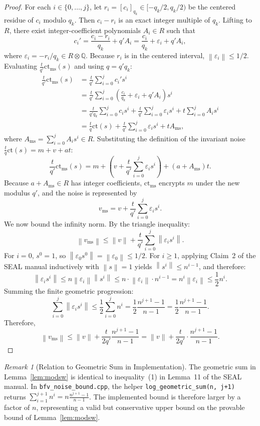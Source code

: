 \documentclass[11pt]{article}
\theoremstyle{definition}
\theoremstyle{remark}
\newtheorem{remark}{Remark}
\newcommand{\norm}[1]{\left\lVert #1\right\rVert}
\newcommand{\ct}{\mathrm{ct}}
\newcommand{\ctms}{\mathrm{ct}_{\mathrm{ms}}}
\newcommand{\vms}{v_{\mathrm{ms}}}
\newcommand{\Sgeo}[1]{\frac{n^{#1+1}-1}{n-1}}
\begin{document}
\begin{proof}
For each $i \in \{0, \dots, j\}$, let $r_i = [c_i]_{q_k} \in [-q_k/2, q_k/2)$ be the centered residue of $c_i$ modulo $q_k$.
Then $c_i - r_i$ is an exact integer multiple of $q_k$.
Lifting to $R$, there exist integer-coefficient polynomials $A_i \in R$ such that
\[
  c_i' = \frac{c_i - r_i}{q_k} + q' A_i = \frac{c_i}{q_k} + \varepsilon_i + q' A_i,
\]
where $\varepsilon_i = -r_i / q_k \in R \otimes \mathbb{Q}$.
Because $r_i$ is in the centered interval, $\norm{\varepsilon_i} \leq 1/2$.
Evaluating $\frac{t}{q'}\ctms(s)$ and using $q = q' q_k$:
\begin{align*}
  \frac{t}{q'}\ctms(s)
  &= \frac{t}{q'}\sum_{i=0}^j c_i' s^i\\
  &= \frac{t}{q'}\sum_{i=0}^j \left(\frac{c_i}{q_k} + \varepsilon_i + q' A_i\right) s^i\\
  &= \frac{t}{q' q_k}\sum_{i=0}^j c_i s^i + \frac{t}{q'}\sum_{i=0}^j \varepsilon_i s^i + t \sum_{i=0}^j A_i s^i\\
  &= \frac{t}{q}\ct(s) + \frac{t}{q'}\sum_{i=0}^j \varepsilon_i s^i + t A_{\mathrm{ms}},
\end{align*}
where $A_{\mathrm{ms}} = \sum_{i=0}^j A_i s^i \in R$.
Substituting the definition of the invariant noise $\frac{t}{q}\ct(s) = m + v + at$:
\[
  \frac{t}{q'}\ctms(s) = m + \left(v + \frac{t}{q'}\sum_{i=0}^j \varepsilon_i s^i\right) + (a + A_{\mathrm{ms}})t.
\]
Because $a + A_{\mathrm{ms}} \in R$ has integer coefficients, $\ctms$ encrypts $m$ under the new modulus $q'$, and the noise is represented by
\[
  \vms = v + \frac{t}{q'}\sum_{i=0}^j \varepsilon_i s^i.
\]
We now bound the infinity norm. By the triangle inequality:
\[
  \norm{\vms} \leq \norm{v} + \frac{t}{q'}\sum_{i=0}^j \norm{\varepsilon_i s^i}.
\]
For $i = 0$, $s^0 = 1$, so $\norm{\varepsilon_0 s^0} = \norm{\varepsilon_0} \leq 1/2$.
For $i \geq 1$, applying Claim~2 of the SEAL manual inductively with $\norm{s} = 1$ yields $\norm{s^i} \leq n^{i-1}$, and therefore:
\[
  \norm{\varepsilon_i s^i} \leq n \norm{\varepsilon_i} \norm{s^i} \leq n \cdot \norm{\varepsilon_i} \cdot n^{i-1} = n^i \norm{\varepsilon_i} \leq \frac{1}{2} n^i.
\]
Summing the finite geometric progression:
\[
  \sum_{i=0}^j \norm{\varepsilon_i s^i} \leq \frac{1}{2}\sum_{i=0}^j n^i = \frac{1}{2}\frac{n^{j+1}-1}{n-1} = \frac{1}{2}\Sgeo{j}.
\]
Therefore,
\[
  \norm{\vms} \leq \norm{v} + \frac{t}{2q'}\Sgeo{j} = \norm{v} + \frac{t}{2q'}\cdot\frac{n^{j+1}-1}{n-1}.
\]
\end{proof}

\begin{remark}[Relation to Geometric Sum in Implementation]
The geometric sum in Lemma~\ref{lem:modsw} is identical to inequality~(1) in Lemma~11 of the SEAL manual.
In \texttt{bfv\_noise\_bound.cpp}, the helper \texttt{log\_geometric\_sum(n, j+1)} returns $\sum_{i=1}^{j+1} n^i = n \Sgeo{j}$.
The implemented bound is therefore larger by a factor of $n$, representing a valid but conservative upper bound on the provable bound of Lemma~\ref{lem:modsw}.
\end{remark}
\end{document}
